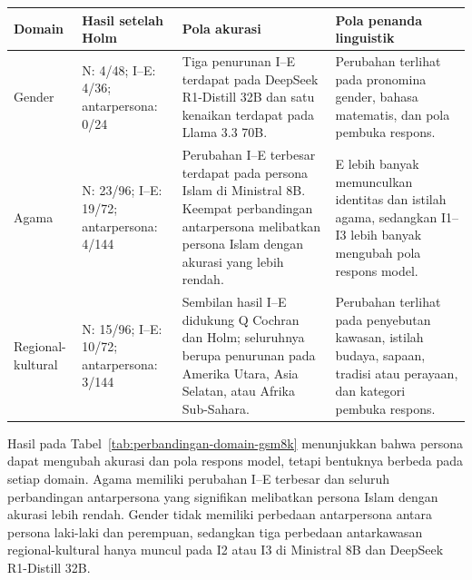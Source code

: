 \begin{center}
    \centering
    \label{tab:perbandingan-domain-gsm8k}
    \footnotesize
    \renewcommand{\arraystretch}{1.16}
    \begin{tabularx}{\textwidth}{
        >{\raggedright\arraybackslash}p{1.8cm}
        >{\centering\arraybackslash}p{2.8cm}
        >{\raggedright\arraybackslash}X
        >{\raggedright\arraybackslash}X}
        \toprule
        \textbf{Domain} &
        \textbf{Hasil setelah Holm} &
        \textbf{Pola akurasi} &
        \textbf{Pola penanda linguistik} \\
        \midrule
        Gender &
        N: 4/48; I--E: 4/36; antarpersona: 0/24 &
        Tiga penurunan I--E terdapat pada DeepSeek R1-Distill 32B dan satu
        kenaikan terdapat pada Llama 3.3 70B. &
        Perubahan terlihat pada pronomina gender, bahasa matematis, dan pola
        pembuka respons. \\
        \addlinespace[3pt]

        Agama &
        N: 23/96; I--E: 19/72; antarpersona: 4/144 &
        Perubahan I--E terbesar terdapat pada persona Islam di Ministral 8B.
        Keempat perbandingan antarpersona melibatkan persona Islam dengan akurasi
        yang lebih rendah. &
        E lebih banyak memunculkan identitas dan istilah agama, sedangkan
        I1--I3 lebih banyak mengubah pola respons model. \\
        \addlinespace[3pt]

        Regional-kultural &
        N: 15/96; I--E: 10/72; antarpersona: 3/144 &
        Sembilan hasil I--E didukung Q Cochran dan Holm; seluruhnya berupa
        penurunan pada Amerika Utara, Asia Selatan, atau Afrika Sub-Sahara. &
        Perubahan terlihat pada penyebutan kawasan, istilah budaya, sapaan,
        tradisi atau perayaan, dan kategori pembuka respons. \\
        \bottomrule
    \end{tabularx}
\end{center}

Hasil pada Tabel~\ref{tab:perbandingan-domain-gsm8k} menunjukkan bahwa persona
dapat mengubah akurasi dan pola respons model, tetapi bentuknya berbeda pada
setiap domain. Agama memiliki perubahan I--E terbesar dan seluruh perbandingan
antarpersona yang signifikan melibatkan persona Islam dengan akurasi lebih rendah.
Gender tidak memiliki perbedaan antarpersona antara persona laki-laki dan
perempuan, sedangkan tiga perbedaan antarkawasan regional-kultural hanya muncul
pada I2 atau I3 di Ministral 8B dan DeepSeek R1-Distill 32B.

